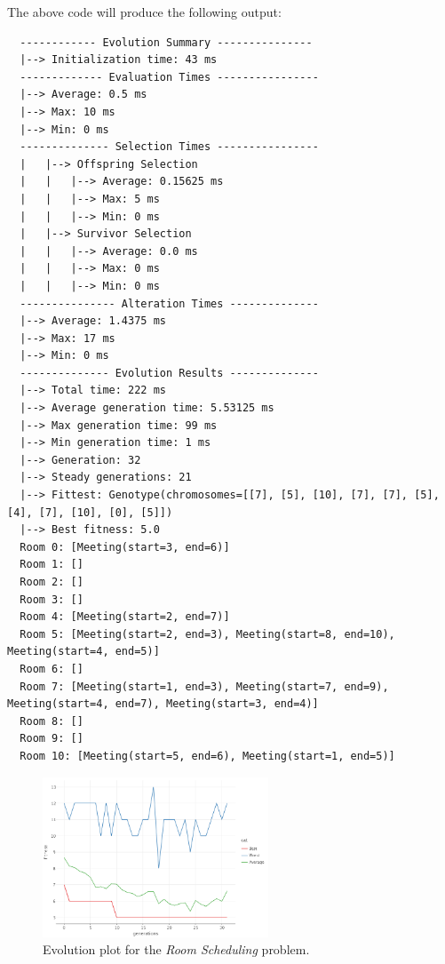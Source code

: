 The above code will produce the following output:

\begin{verbatim}
  ------------ Evolution Summary ---------------
  |--> Initialization time: 43 ms
  ------------- Evaluation Times ----------------
  |--> Average: 0.5 ms
  |--> Max: 10 ms
  |--> Min: 0 ms
  -------------- Selection Times ----------------
  |   |--> Offspring Selection
  |   |   |--> Average: 0.15625 ms
  |   |   |--> Max: 5 ms
  |   |   |--> Min: 0 ms
  |   |--> Survivor Selection
  |   |   |--> Average: 0.0 ms
  |   |   |--> Max: 0 ms
  |   |   |--> Min: 0 ms
  --------------- Alteration Times --------------
  |--> Average: 1.4375 ms
  |--> Max: 17 ms
  |--> Min: 0 ms
  -------------- Evolution Results --------------
  |--> Total time: 222 ms
  |--> Average generation time: 5.53125 ms
  |--> Max generation time: 99 ms
  |--> Min generation time: 1 ms
  |--> Generation: 32
  |--> Steady generations: 21
  |--> Fittest: Genotype(chromosomes=[[7], [5], [10], [7], [7], [5], [4], [7], [10], [0], [5]])
  |--> Best fitness: 5.0
  Room 0: [Meeting(start=3, end=6)]
  Room 1: []
  Room 2: []
  Room 3: []
  Room 4: [Meeting(start=2, end=7)]
  Room 5: [Meeting(start=2, end=3), Meeting(start=8, end=10), Meeting(start=4, end=5)]
  Room 6: []
  Room 7: [Meeting(start=1, end=3), Meeting(start=7, end=9), Meeting(start=4, end=7), Meeting(start=3, end=4)]
  Room 8: []
  Room 9: []
  Room 10: [Meeting(start=5, end=6), Meeting(start=1, end=5)]

\end{verbatim}

\begin{figure}[ht!]
  \centering
  \includegraphics[width=0.6\textwidth]{img/java_6eGIGC5z5r.png}
  \caption{Evolution plot for the \textit{Room Scheduling} problem.}
  \label{fig:app:keen_room_scheduling}
\end{figure}
